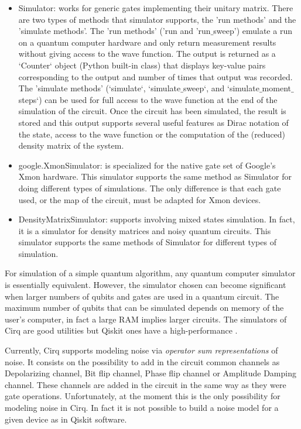 \begin{itemize}
	\item {\selectfont Simulator}: works for generic gates implementing their unitary matrix. There are two types of methods that simulator supports, the 'run methods' and the 'simulate methods'. The 'run methods' ('run 	and 'run$\_$sweep') 	emulate a run on a quantum computer hardware and only return measurement results without giving access to the wave function. The output is returned as a `Counter` object (Python built-in class) that displays 	key-value pairs corresponding to the output and number of times that output was recorded.  The 'simulate methods' (`simulate`, `simulate$\_$sweep`, and `simulate$\_$moment$\_$steps`) can be used for full access to the 	wave function at the end of the simulation of the circuit. Once the circuit has been simulated, the result is stored and this output supports several useful features as Dirac notation of the state, access to the wave function or the computation of the (reduced) density matrix of the system.
	
	\item {\selectfont google.XmonSimulator}: is specialized for the native gate set of Google’s Xmon hardware. This simulator supports the same method as {\selectfont Simulator} for doing different types of simulations. The only difference is that each gate used, or the map of the circuit, must be adapted for Xmon devices.
	
	\item {\selectfont DensityMatrixSimulator}: supports involving mixed states simulation. In fact, it is a simulator for density matrices and noisy quantum circuits. This simulator supports the same methods of {		\selectfont Simulator} for 	different types of simulation.
\end{itemize}
\noindent
For simulation of a simple quantum algorithm, any quantum computer simulator is essentially equivalent. However, the simulator chosen can become significant when larger numbers of qubits and gates are used in a quantum circuit.
The maximum number of qubits that can be simulated depends on memory of the user’s computer, in fact a large RAM implies larger circuits.
The simulators of Cirq are good utilities but Qiskit ones have a high-performance \cite{SoftwareComparisonGeneral}  \cite{SoftwareComparisonCirq}.

Currently, Cirq supports modeling noise via \textit{operator sum representations} of noise. It consists on the possibility to add in the circuit common channels as Depolarizing channel,  Bit flip channel, Phase flip channel or Amplitude Damping channel. These channels are added in the circuit in the same way as they were gate operations. Unfortunately, at the moment this is the only possibility for modeling noise in Cirq. In fact it is not possible to build a noise model for a given device as in Qiskit software.

